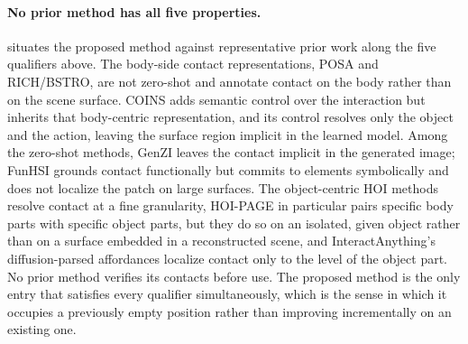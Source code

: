 \paragraph{No prior method has all five properties.}  situates the proposed method against representative prior work along the five qualifiers above. The body-side contact representations, POSA and RICH/BSTRO, are not zero-shot and annotate contact on the body rather than on the scene surface. COINS adds semantic control over the interaction but inherits that body-centric representation, and its control resolves only the object and the action, leaving the surface region implicit in the learned model. Among the zero-shot methods, GenZI leaves the contact implicit in the generated image; FunHSI grounds contact functionally but commits to elements symbolically and does not localize the patch on large surfaces. The object-centric HOI methods resolve contact at a fine granularity, HOI-PAGE in particular pairs specific body parts with specific object parts, but they do so on an isolated, given object rather than on a surface embedded in a reconstructed scene, and InteractAnything's diffusion-parsed affordances localize contact only to the level of the object part. No prior method verifies its contacts before use. The proposed method is the only entry that satisfies every qualifier simultaneously, which is the sense in which it occupies a previously empty position rather than improving incrementally on an existing one.

